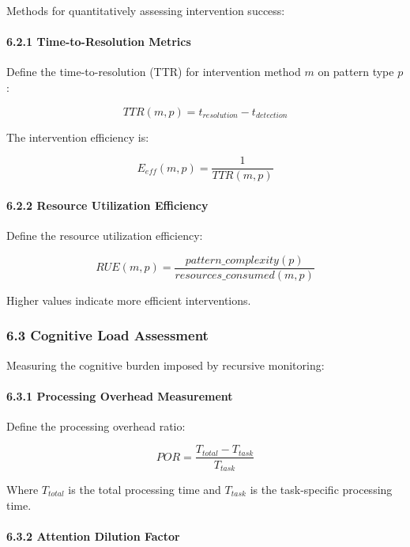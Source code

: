 \documentclass[
]{article}
\begin{document}
Methods for quantitatively assessing intervention success:

\paragraph{6.2.1 Time-to-Resolution
Metrics}\label{time-to-resolution-metrics}

Define the time-to-resolution (TTR) for intervention method \(m\) on
pattern type \(p\):

\[TTR(m, p) = t_{resolution} - t_{detection}\]

The intervention efficiency is:

\[E_{eff}(m, p) = \frac{1}{TTR(m, p)}\]

\paragraph{6.2.2 Resource Utilization
Efficiency}\label{resource-utilization-efficiency}

Define the resource utilization efficiency:

\[RUE(m, p) = \frac{pattern\_complexity(p)}{resources\_consumed(m, p)}\]

Higher values indicate more efficient interventions.

\subsubsection{6.3 Cognitive Load
Assessment}\label{cognitive-load-assessment}

Measuring the cognitive burden imposed by recursive monitoring:

\paragraph{6.3.1 Processing Overhead
Measurement}\label{processing-overhead-measurement}

Define the processing overhead ratio:

\[POR = \frac{T_{total} - T_{task}}{T_{task}}\]

Where \(T_{total}\) is the total processing time and \(T_{task}\) is the
task-specific processing time.

\paragraph{6.3.2 Attention Dilution
Factor}\label{attention-dilution-factor}
\end{document}
